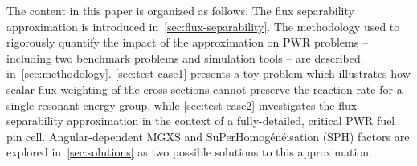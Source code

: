 The content in this paper is organized as follows. The flux separability approximation is introduced in~\autoref{sec:flux-separability}. The methodology used to rigorously quantify the impact of the approximation on PWR problems -- including two benchmark problems and simulation tools -- are described in~\autoref{sec:methodology}. \autoref{sec:test-case1} presents a toy problem which illustrates how scalar flux-weighting of the cross sections cannot preserve the reaction rate for a single resonant energy group, while \autoref{sec:test-case2} investigates the flux separability approximation in the context of a fully-detailed, critical PWR fuel pin cell. Angular-dependent MGXS and SuPerHomog\'{e}n\'{e}isation (SPH) factors are explored in~\autoref{sec:solutions} as two possible solutions to this approximation.
